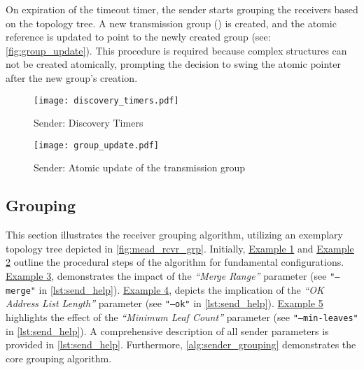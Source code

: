 On expiration of the timeout timer, the sender starts grouping the receivers
    based on the topology tree.
A new transmission group () is created, and the atomic
    reference is updated to point to the newly created group (see:
    \autoref{fig:group_update}).
This procedure is required because complex structures can not be created
    atomically, prompting the decision to swing the atomic pointer after the
    new group's creation.


\begin{figure}
    \begin{center}
        \texttt{[image: discovery\_timers.pdf]}
    \end{center}
    \caption{Sender: Discovery Timers}
    \label{fig:discovery_timers}
\end{figure}

\begin{figure}
    \begin{center}
        \texttt{[image: group\_update.pdf]}
    \end{center}
    \caption{Sender: Atomic update of the transmission group}
    \label{fig:group_update}
\end{figure}

\subsection{Grouping} %
\label{sub:Grouping}
This section illustrates the receiver grouping algorithm, utilizing an exemplary
    topology tree depicted in \autoref{fig:mead_rcvr_grp}.
Initially, \hyperref[sec:Max 5]{Example 1} and \hyperref[sec:Max 10]{Example 2}
    outline the procedural steps of the algorithm for fundamental configurations.
\hyperref[sec:Max 10 Merge 1]{Example 3}, demonstrates the impact of the \textit{``Merge
    Range''} parameter (see \texttt{"--merge"} in \autoref{lst:send_help}).
\hyperref[sec:Max 12 Ok 7]{Example 4}, depicts the implication of the \textit{``OK Address
    List Length''} parameter (see \texttt{"--ok"} in \autoref{lst:send_help}).
\hyperref[sec:Max 10 Min Leaf 3]{Example 5} highlights the effect of the \textit{``Minimum
    Leaf Count''} parameter (see \texttt{"--min-leaves"} in \autoref{lst:send_help}).
A comprehensive description of all sender parameters is provided in \autoref{lst:send_help}.
Furthermore, \autoref{alg:sender_grouping} demonstrates the core grouping
    algorithm.

